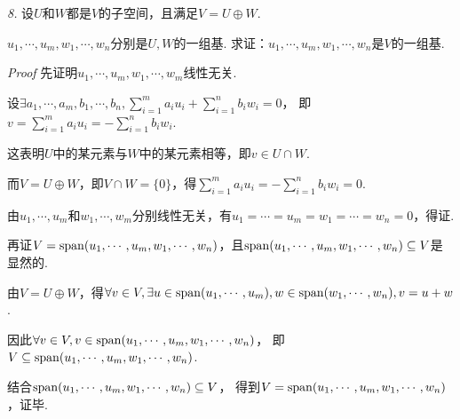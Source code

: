 \textit{8.}
设\(U\)和\(W\)都是\(V\)的子空间，且满足\(V=U \oplus W\).

\(u_1,\cdots,u_m,w_1,\cdots,w_n\)分别是\(U,W\)的一组基.
求证：\(u_1,\cdots,u_m,w_1,\cdots,w_n\)是\(V\)的一组基.

\textit{Proof}
先证明\(u_1,\cdots,u_m,w_1,\cdots,w_m\)线性无关.

设\(\exists a_1,\cdots,a_m,b_1,\cdots,b_n,\sum_{i=1}^m a_iu_i+\sum_{i=1}^n b_iw_i=0\)，
即\(v=\sum_{i=1}^m a_iu_i=-\sum_{i=1}^n b_iw_i\).

这表明\(U\)中的某元素与\(W\)中的某元素相等，即\(v\in U\cap W\).

而\(V=U\oplus W\)，即\(V\cap W=\{0\}\)，得\(\sum_{i=1}^m a_iu_i=-\sum_{i=1}^n b_iw_i=0\).

由\(u_1,\cdots,u_m\)和\(w_1,\cdots,w_m\)分别线性无关，有\(u_1=\cdots=u_m=w_1=\cdots=w_n=0\)，得证.

再证\(V=\mathrm{span}(u_1,\cdots,u_m,w_1,\cdots,w_n)\)，且\(\mathrm{span}(u_1,\cdots,u_m,w_1,\cdots,w_n) \subseteq V\)是显然的.

由\(V=U\oplus W\)，得\(\forall v\in V,\exists u \in \mathrm{span}(u_1,\cdots,u_m),w \in \mathrm{span}(w_1,\cdots,w_n),v=u+w\).

因此\(\forall v \in V,v \in \mathrm{span} (u_1,\cdots,u_m,w_1,\cdots,w_n)\)，
即\(V \subseteq \mathrm{span}(u_1,\cdots,u_m,w_1,\cdots,w_n)\).

结合\(\mathrm{span}(u_1,\cdots,u_m,w_1,\cdots,w_n) \subseteq V\)，
得到\(V=\mathrm{span} (u_1,\cdots,u_m,w_1,\cdots,w_n)\)，证毕.


